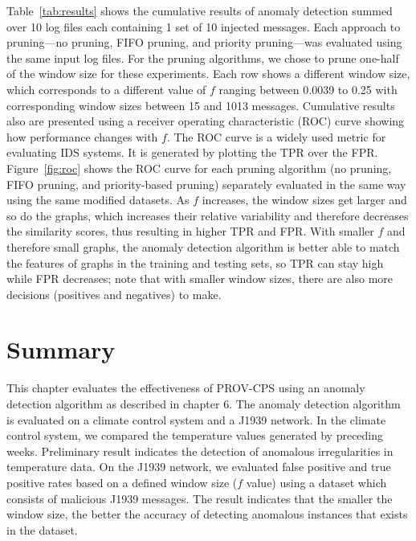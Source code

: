 Table~\ref{tab:results} shows the cumulative results of anomaly detection summed over 10 log files each containing 1 set of 10 injected messages. Each approach to pruning---no pruning, FIFO pruning, and priority pruning---was evaluated using the same input log files.  For the pruning algorithms, we chose to prune one-half of the window size for these experiments. Each row shows a different window size, which corresponds to a different value of $f$ ranging between 0.0039 to 0.25 with corresponding window sizes between 15 and 1013 messages. Cumulative results also are presented using a receiver operating characteristic (ROC) curve showing how performance changes with $f$. The ROC curve is a widely used metric for evaluating IDS systems. It is generated by plotting the TPR over the FPR. Figure~\ref{fig:roc} shows the ROC curve for each pruning algorithm (no pruning, FIFO pruning, and priority-based pruning) separately evaluated in the same way using the same modified datasets. As $f$ increases, the window sizes get larger and so do the graphs, which increases their relative variability and therefore decreases the similarity scores, thus resulting in higher TPR and FPR. With smaller $f$ and therefore small graphs, the anomaly detection algorithm is better able to match the features of graphs in the training and testing sets, so TPR can stay high while FPR decreases; note that with smaller window sizes, there are also more decisions (positives and negatives) to make. 


\section{Summary}
This chapter evaluates the effectiveness of PROV-CPS using an anomaly detection algorithm as described in chapter 6. The anomaly detection algorithm is evaluated on a climate control system and a J1939 network. In the climate control system, we compared the temperature values generated by preceding weeks. Preliminary result indicates the detection of anomalous irregularities in temperature data. On the J1939 network, we evaluated false positive and true positive rates based on a defined window size ($f$ value) using a dataset which consists of malicious J1939 messages. The result indicates that the smaller the window size, the better the accuracy of detecting anomalous instances that exists in the dataset.
